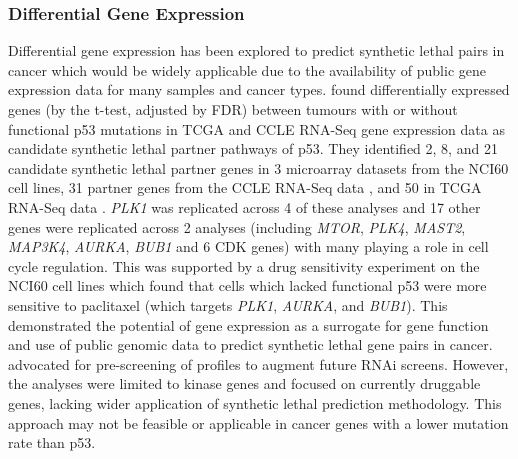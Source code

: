 
\subsubsection{Differential Gene Expression}

Differential \gls{gene expression} has been explored to predict \gls{synthetic lethal} pairs in cancer which would be widely applicable due to the availability of public \gls{gene expression} data for many samples and cancer types. \citet{Wang2013} found differentially expressed genes (by the t-test, adjusted by \gls{FDR}) between \glspl{tumour} with or without functional p53 \glspl{mutation} in \gls{TCGA} \citep{TCGA2008GBM} and \gls{CCLE} \citep{Barretina2012} \gls{RNA-Seq} \gls{gene expression} data as candidate \gls{synthetic lethal} partner pathways of p53. They identified 2, 8, and 21 candidate \gls{synthetic lethal} partner genes in 3 \gls{microarray} datasets from the NCI60 cell lines, 31 partner genes from the \gls{CCLE} \gls{RNA-Seq} data \citep{Barretina2012}, and 50 in \gls{TCGA} \gls{RNA-Seq} data \citep{TCGA2012CRC}. \textit{PLK1} was replicated across 4 of these analyses and 17 other genes were replicated across 2 analyses (including \textit{MTOR}, \textit{PLK4}, \textit{MAST2}, \textit{MAP3K4}, \textit{AURKA}, \textit{BUB1} and 6 CDK genes) with many playing a role in cell cycle regulation. This was supported by a drug sensitivity experiment on the NCI60 cell lines which found that cells which lacked functional p53 were more sensitive to paclitaxel (which targets \textit{PLK1}, \textit{AURKA}, and \textit{BUB1}). This demonstrated the potential of \gls{gene expression} as a surrogate for gene function and use of public \gls{genomic} data to predict \gls{synthetic lethal} gene pairs in cancer. \citet{Wang2013} advocated for pre-screening of  profiles to augment future \gls{RNAi} screens. However, the analyses were limited to kinase genes and focused on currently druggable genes, lacking wider application of \gls{synthetic lethal} prediction methodology. This approach may not be feasible or applicable in \glspl{cancer gene} with a lower \gls{mutation} rate than p53.  

